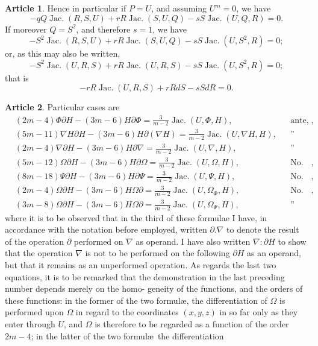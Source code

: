 \documentclass[11pt,a4paper]{article}
\theoremstyle{definition}
\newtheorem{art}{Article}[section]
\DeclareMathOperator{\Jac}{Jac.}
\begin{document}
\setcounter{art}{34}
\begin{art}
Hence in particular if $P=U$, and assuming $U^m = 0$, we have
\[
- qQ \Jac(R, S, U) + rR \Jac(S, U, Q) - sS \Jac(U, Q, R) = 0.
\]
If moreover $Q = S^2$, and therefore $s = 1$, we have
\[
- S^2 \Jac(R, S, U) + rR \Jac(S, U, Q) - sS \Jac(U, S^2, R) = 0;
\]
or, as this may also be written,
\[
- S^2 \Jac(U, R, S) + rR \Jac(U, R, S) - sS \Jac(U, S^2, R) = 0;
\]
that is
\[
-rR \Jac(U, R, S) + rR dS - sS dR = 0.
\]
\end{art}

\begin{art}
Particular cases are
\begin{align}
&(2m-4)\Phi \partial H - (3m-6)H \partial \Phi = \tfrac{3}{m-2}\Jac(U, \Phi, H),
&&\text{ante, No.\ 12}, \\
&(5m-11)\nabla H \partial H - (3m-6)H \partial(\nabla H)
= \tfrac{3}{m-2}\Jac(U, \nabla H, H),
&&\text{''} \\
&(2m-4)\nabla \partial H - (3m-6)H \partial \nabla = \tfrac{3}{m-2}\Jac(U, \nabla, H),
&&\text{''} \\
&(5m-12)\Omega \partial H - (3m-6)H \partial \Omega
= \tfrac{3}{m-2}\Jac(U, \Omega, H),
&&\text{No.\ 18}, \\
&(8m-18)\Psi \partial H - (3m-6)H \partial \Psi
= \tfrac{3}{m-2}\Jac(U, \Psi, H),
&&\text{No.\ 19}, \\
&(2m-4)\Omega \partial H - (3m-6)H \Omega \partial
= \tfrac{3}{m-2}\Jac(U, \Omega_\Phi, H),
&&\text{No.\ 25}, \\
&(3m-8)\Omega \partial H - (3m-6)H \Omega \partial
= \tfrac{3}{m-2}\Jac(U, \Omega_\Psi, H),
&&\text{''}
\end{align}
where it is to be observed that in the third of these formulae I have, in accordance
with the notation before employed, written $\partial . \nabla$ to denote the result of the operation
$\partial$ performed on $\nabla$ as operand. I have also written $\nabla : \partial H$ to show that the operation
$\nabla$ is not to be performed on the following $\partial H$ as an operand, but that it remains
as an unperformed operation. As regards the last two equations, it is to be remarked
that the demonstration in the last preceding number depends merely on the homo-
geneity of the functions, and the orders of these functions: in the former of the two
formul\ae, the differentiation of $\Omega$ is performed upon $\Omega$ in regard to the coordinates
$(x, y, z)$ in so far only as they enter through $U$, and $\Omega$ is therefore to be regarded
as a function of the order $2m-4$; in the latter of the two formul\ae\ the differentiation

\end{art}
\end{document}
